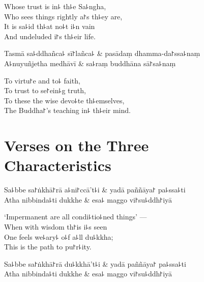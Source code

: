 \begin{english}
  Whose trust is in꜕ th꜕e Sa꜕ngha,\\
  Who sees things rightly a꜓s th꜕ey are,\\
  It is sa꜕id th꜕at no꜕t i꜕n vain\\
  And undeluded i꜓s th꜕eir life.
\end{english}

\begin{twochants}
  Tasmā sa꜕ddhañca꜕ sī꜓lañca꜕ & pasādaṃ dhamma-da꜓ssa꜕naṃ \\
  A꜕nuyuñjetha medhāvī & sa꜕raṃ buddhāna sā꜓sa꜕naṃ \\
\end{twochants}

\begin{english}
  To virtu꜓e and to꜕ faith,\\
  To trust to se꜓ein꜕g truth,\\
  To these the wise devo꜕te th꜕emselves,\\
  The Buddha꜓'s teaching in꜕ th꜕eir mind.
\end{english}

\chapter{Verses on the Three Characteristics}%


\begin{leader}
\end{leader}

\begin{twochants}
  Sa꜕bbe sa꜓ṅkhā꜓rā a꜕ni꜓ccā't꜕i & yadā paññāya꜓ pa꜕ssa꜕ti \\
  Atha nibbinda꜕ti dukkhe & esa꜕ maggo vi꜓su꜕ddh꜓iyā \\
\end{twochants}

\begin{english}
  `Impermanent are all condi꜕tio꜕ned things' ---\\
  When with wisdom th꜓is i꜕s seen\\
  One feels we꜕ary꜕ o꜕f a꜕ll du꜕kkha;\\
  This is the path to pu꜓r꜕ity.
\end{english}

\begin{twochants}
  Sa꜕bbe sa꜓ṅkhā꜓rā du꜕kkhā't꜕i & yadā paññāya꜓ pa꜕ssa꜕ti \\
  Atha nibbinda꜕ti dukkhe & esa꜕ maggo vi꜓su꜕ddh꜓iyā \\
\end{twochants}

